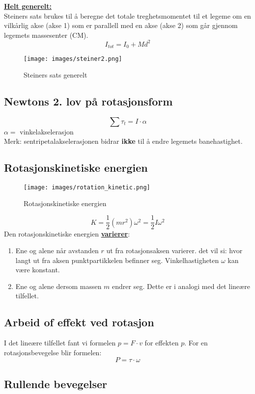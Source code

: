 \documentclass[12pt]{article}
\begin{document}
\underline{\textbf{Helt generelt:}}\\
Steiners sats brukes til å beregne det totale treghetsmomentet til et legeme om en vilkårlig akse (akse 1) som er parallell med en akse (akse 2) som går gjennom legemets massesenter (CM).
$$I_{tot} = I_0 + Md^2$$
\begin{figure} [H]
    \centering
    \texttt{[image: images/steiner2.png]}
    \caption{Steiners sats generelt}
\end{figure}


\subsection{Newtons 2. lov på rotasjonsform}
$$\sum \tau_t = I\cdot \alpha$$
$\alpha =$ vinkelakselerasjon\\
Merk: sentripetalakselerasjonen bidrar \textbf{ikke} til å endre legemets banehastighet.


\subsection{Rotasjonskinetiske energien}
\begin{figure} [H]
    \centering
    \texttt{[image: images/rotation\_kinetic.png]}
    \caption{Rotasjonskinetiske energien}
\end{figure}
$$K = \frac{1}{2}(mr^2)\omega^2 = \frac{1}{2}I\omega^2$$
Den rotasjonskinetiske energien \underline{\textbf{varierer}}:
\begin{enumerate}
    \item Ene og alene når avstanden $r$ ut fra rotasjonsaksen varierer. det vil si: hvor langt ut fra aksen punktpartikkelen befinner seg. Vinkelhastigheten $\omega$ kan være konstant.
    \item Ene og alene dersom massen $m$ endrer seg. Dette er i analogi med det lineære tilfellet.
\end{enumerate}

\subsection{Arbeid of effekt ved rotasjon}
I det lineære tilfellet fant vi formelen $p = F\cdot v$ for effekten $p$.
For en rotasjonsbevegelse blir formelen:
$$P = \tau \cdot \omega$$

\subsection{Rullende bevegelser}
\end{document}
